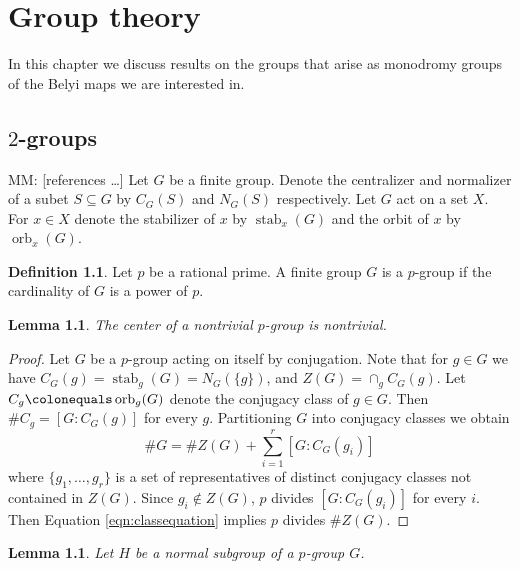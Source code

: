 \documentclass{dcthesis}
\newcommand{\defi}[1]{\textsf{#1}}
\newcommand{\mm}[1]{{\color{blue} \sf MM: [#1]}}
\DeclareMathOperator{\stab}{stab}
\DeclareMathOperator{\orb}{orb}
\numberwithin{equation}{section}
\newtheorem{lemma}[equation]{Lemma}
\theoremstyle{definition}
\newtheorem{definition}[equation]{Definition}
\theoremstyle{remark}
\begin{document}
\chapter{Group theory}{\label{chapter:grouptheory}
  In this chapter we discuss results on the groups
  that arise as monodromy groups
  of the Belyi maps we are interested in.
  \section{$2$-groups}{\label{sec:twogroups}
    \mm{references \cite{DF}\ldots}
    Let $G$ be a finite group.
    Denote the \defi{centralizer} and
    \defi{normalizer} of a subet $S\subseteq G$
    by $C_G(S)$ and $N_G(S)$ respectively.
    Let $G$ act on a set $X$.
    For $x\in X$
    denote the \defi{stabilizer of $x$} by
    $\stab_x(G)$
    and the \defi{orbit of $x$} by
    $\orb_x(G)$.
    \begin{definition}
      \label{def:pgroup}
      Let $p$ be a rational prime.
      A finite group $G$ is a
      \defi{$p$-group}
      if the cardinality of $G$
      is a power of $p$.
    \end{definition}
    \begin{lemma}
      \label{lem:pgrouphasacenter}
      The center of a nontrivial $p$-group is nontrivial.
    \end{lemma}
    \begin{proof}
      Let $G$ be a $p$-group acting on itself by conjugation.
      Note that for $g\in G$ we have
      $C_G(g)=\stab_g(G)=N_G(\{g\})$,
      and
      $Z(G)=\cap_g C_G(g)$.
      Let
      $C_g\colonequals\orb_g(G)$
      denote the conjugacy class of $g\in G$.
      Then $\#C_g = [G:C_G(g)]$ for every $g$.
      Partitioning $G$ into conjugacy classes we obtain
      \begin{equation}\label{eqn:classequation}
        \#G =
        \#Z(G)+\sum_{i=1}^r[G:C_G(g_i)]
      \end{equation}
      where $\{g_1,\dots,g_r\}$ is a set of representatives of distinct
      conjugacy classes not contained in $Z(G)$.
      Since $g_i\not\in Z(G)$, $p$ divides $[G:C_G(g_i)]$ for every $i$.
      Then Equation \ref{eqn:classequation} implies $p$ divides
      $\#Z(G)$.
    \end{proof}
    \begin{lemma}
      \label{lem:conjugacyinsubgroups}
      Let $H$ be a normal subgroup of a $p$-group $G$.

\end{lemma}}}
\end{document}
